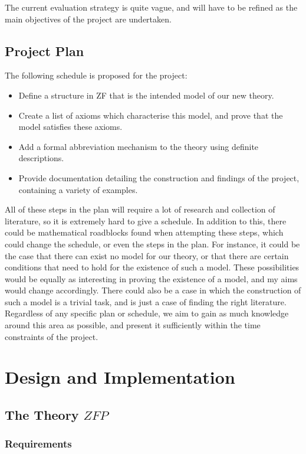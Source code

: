 \documentclass[11pt]{report}
\theoremstyle{definition}
\theoremstyle{theorem}
\theoremstyle{lemma}
\begin{document}
The current evaluation strategy is quite vague, and will have to be refined as the main objectives of the project are undertaken.

\section{Project Plan}
The following schedule is proposed for the project:
\begin{itemize}
\item Define a structure in ZF that is the intended model of our new theory.
\item Create a list of axioms which characterise this model, and prove that the model satisfies these axioms.
\item Add a formal abbreviation mechanism to the theory using definite descriptions.
\item Provide documentation detailing the construction and findings of the project, containing a variety of examples.
\end{itemize}
All of these steps in the plan will require a lot of research and collection of literature, so it is extremely hard to give a schedule.
In addition to this, there could be mathematical roadblocks found when attempting these steps, which could change the schedule, or even the steps in the plan.
For instance, it could be the case that there can exist no model for our theory, or that there are certain conditions that need to hold for the existence of such a model.
These possibilities would be equally as interesting in proving the existence of a model, and my aims would change accordingly.
There could also be a case in which the construction of such a model is a trivial task, and is just a case of finding the right literature.
Regardless of any specific plan or schedule, we aim to gain as much knowledge around this area  as possible, and present it sufficiently within the time constraints of the project.

\chapter{Design and Implementation}
\section{The Theory $\mathit{ZFP}$}
\subsection{Requirements}
\end{document}
